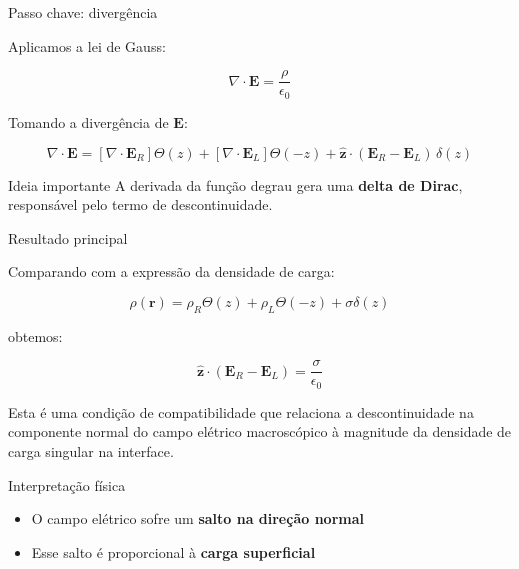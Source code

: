\documentclass[aspectratio=169]{beamer}
\begin{document}
\begin{frame}{Passo chave: divergência}
\small

Aplicamos a lei de Gauss:

\[
\nabla\cdot \mathbf{E} = \frac{\rho}{\epsilon_0}
\]

\vspace{0.1cm}

Tomando a divergência de \(\mathbf{E}\):

\begin{equation}
\nabla\cdot \mathbf{E}
=
[\nabla\cdot \mathbf{E}_R]\Theta(z)
+
[\nabla\cdot \mathbf{E}_L]\Theta(-z)
+
\hat{\mathbf{z}}\cdot(\mathbf{E}_R-\mathbf{E}_L)\,\delta(z)
\tag{2.47}
\end{equation}

\vspace{0.1cm}

\begin{block}{Ideia importante}
A derivada da função degrau gera uma \textbf{delta de Dirac}, responsável pelo termo de descontinuidade.
\end{block}

\end{frame}

\begin{frame}{Resultado principal}
\small

Comparando com a expressão da densidade de carga:

\[
\rho(\mathbf{r}) = \rho_R\Theta(z)+\rho_L\Theta(-z)+\sigma\delta(z)
\]

obtemos:

\begin{equation}
\hat{\mathbf{z}}\cdot(\mathbf{E}_R-\mathbf{E}_L)
=
\frac{\sigma}{\epsilon_0}
\tag{2.48}
\end{equation}

Esta é uma condição de compatibilidade que relaciona a descontinuidade na componente normal do campo elétrico macroscópico à magnitude da densidade de carga singular na interface.

\vspace{0.2cm}

\begin{alertblock}{Interpretação física}
\begin{itemize}
\item O campo elétrico sofre um \textbf{salto na direção normal}
\item Esse salto é proporcional à \textbf{carga superficial}
\end{itemize}
\end{alertblock}

\end{frame}
\end{document}

